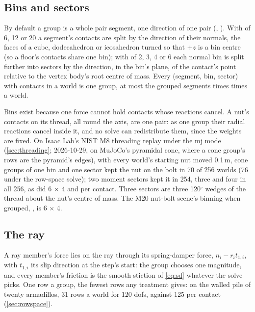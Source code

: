 \subsection{Bins and sectors}\label{sec:variables}

By default a group is a whole pair segment, one direction of one pair (, ). With  of 6, 12 or 20 a segment's contacts are split by the direction of their normals, the faces of a cube, dodecahedron or icosahedron turned so that $+z$ is a bin centre (so a floor's contacts share one bin); with  of 2, 3, 4 or 6 each normal bin is split further into sectors by the direction, in the bin's plane, of the contact's point relative to the vertex body's root centre of mass. Every (segment, bin, sector) with contacts in a world is one group, at most the grouped segments times  times  a world.

Bins exist because one force cannot hold contacts whose reactions cancel. A nut's contacts on its thread, all round the axis, are one pair: as one group their radial reactions cancel inside it, and no solve can redistribute them, since the weights are fixed. On Isaac Lab's NIST M8 threading replay under the mj mode (\cref{sec:threading}; 2026-10-29, on MuJoCo's pyramidal cone, where a cone group's rows are the pyramid's edges), with every world's starting nut moved 0.1\,\micro m, cone groups of one bin and one sector kept the nut on the bolt in 70 of 256 worlds (76 under the row-space solve); two moment sectors kept it in 254, three and four in all 256, as did 6 $\times$ 4 and per contact. Three sectors are three 120$^\circ$ wedges of the thread about the nut's centre of mass. The M20 nut-bolt scene's binning when grouped, , is 6 $\times$ 4.

\subsection{The ray}\label{sec:ray}

A ray member's force lies on the ray through its spring-damper force, $n_i - r_i t_{1,i}$, with $t_{1,i}$ its slip direction at the step's start: the group chooses one magnitude, and every member's friction is the smooth stiction of \cref{eq:sd} whatever the solve picks. One row a group, the fewest rows any treatment gives: on the walled pile of twenty armadillos, 31 rows a world for 120 dofs, against 125 per contact (\cref{sec:rowspace}).

